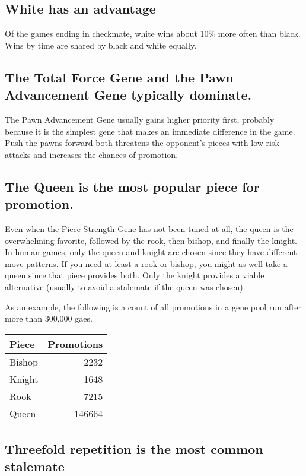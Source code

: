 \documentclass[letter]{article}
\renewcommand\_{\textunderscore\allowbreak}
\begin{document}
\subsection*{White has an advantage}

Of the games ending in checkmate, white wins about 10\% more often than black. Wins by time are shared by black and white equally.

\subsection*{The Total Force Gene and the Pawn Advancement Gene typically dominate.}

The Pawn Advancement Gene usually gains higher priority first, probably because it is the simplest gene that makes an immediate difference in the game. Push the pawns forward both threatens the opponent's pieces with low-risk attacks and increases the chances of promotion.

\subsection*{The Queen is the most popular piece for promotion.}

Even when the Piece Strength Gene has not been tuned at all, the queen is the overwhelming favorite, followed by the rook, then bishop, and finally the knight. In human games, only the queen and knight are chosen since they have different move patterns. If you need at least a rook or bishop, you might as well take a queen since that piece provides both. Only the knight provides a viable alternative (usually to avoid a stalemate if the queen was chosen).

As an example, the following is a count of all promotions in a gene pool run after more than 300,000 gaes.
\begin{center}
\begin{tabular}{l|r}
	Piece & Promotions \\
\hline
	Bishop & 2232  \\
	Knight  &  1648 \\
	Rook    &  7215 \\
	Queen  & 146664 \\
\end{tabular}
\end{center}


\subsection*{Threefold repetition is the most common stalemate}
\end{document}
